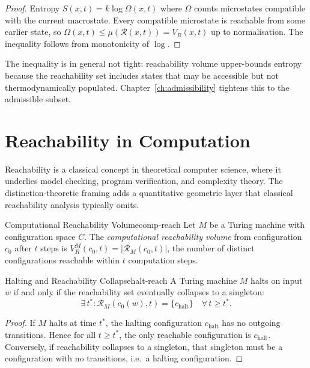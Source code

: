 \documentclass[12pt,twoside,openright]{book}
\newcommand{\csicon} {\marginpar{\tiny\color{DistBlue}\faCode}}
\newcommand{\reach}{\mathcal{R}}
\begin{document}
\begin{proof}
  Entropy $S(x,t)=k\log\Omega(x,t)$ where $\Omega$ counts
  microstates compatible with the current macrostate. Every
  compatible microstate is reachable from some earlier
  state, so $\Omega(x,t)\le\mu(\reach(x,t))=V_R(x,t)$ up to
  normalisation. The inequality follows from monotonicity
  of $\log$.
\end{proof}

The inequality is in general not tight: reachability volume
upper-bounds entropy because the reachability set includes
states that may be accessible but not thermodynamically
populated. Chapter~\ref{ch:admissibility} tightens this to
the admissible subset.

\section{Reachability in Computation}
\label{sec:ch13-computation}

\csicon
Reachability is a classical concept in theoretical computer
science, where it underlies model checking, program
verification, and complexity theory. The
distinction-theoretic framing adds a quantitative geometric
layer that classical reachability analysis typically omits.

\begin{definition}{Computational Reachability Volume}{comp-reach}
  Let $M$ be a Turing machine with configuration space $C$.
  The \emph{computational reachability volume} from
  configuration $c_0$ after $t$ steps is
  $V_R^M(c_0,t) = |\reach_M(c_0,t)|$, the number of
  distinct configurations reachable within $t$ computation
  steps.
\end{definition}

\begin{proposition}{Halting and Reachability Collapse}{halt-reach}
  A Turing machine $M$ halts on input $w$ if and only if
  the reachability set eventually collapses to a singleton:
  \[
    \exists\, t^* :
    \reach_M(c_0(w),t) = \{c_\mathrm{halt}\}
    \quad \forall\, t \ge t^*.
  \]
\end{proposition}

\begin{proof}
  If $M$ halts at time $t^*$, the halting configuration
  $c_\mathrm{halt}$ has no outgoing transitions. Hence for
  all $t\ge t^*$, the only reachable configuration is
  $c_\mathrm{halt}$. Conversely, if reachability collapses
  to a singleton, that singleton must be a configuration
  with no transitions, i.e.\ a halting configuration.
\end{proof}
\end{document}
